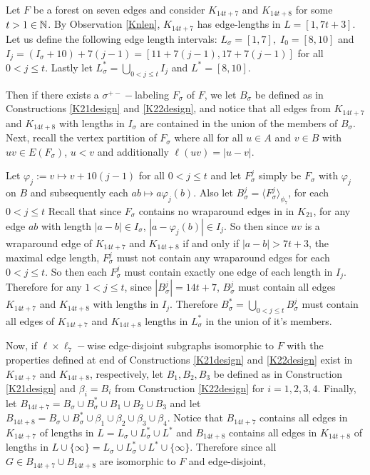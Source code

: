 \begin{construction}\label{7,8mod14}
    Let $F$ be a forest on seven edges and consider $K_{14t+7}$ and $K_{14t+8}$ for some $t > 1\in \mathbb{N}$. By Observation \ref{Knlen}, $K_{14t+7}$ has edge-lengths in $L = [1,7t+3]$.
    Let us define the following edge length intervals: $L_{\sigma}=[1,7],\;I_{0}=[8,10]$ and $I_{j}=(I_{\sigma}+10)+7(j-1)=[11+7(j-1),17+7(j-1)]$ for all $0<j\leq t$. Lastly let $L_{\sigma}^{*}=\bigcup_{0<j\leq t} I_{j}$ and $L^{*}=[8,10]$.

    Then if there exists a $\sigma^{+-}-$labeling $F_{\sigma}$ of $F$, we let $B_{\sigma}$ be defined as in Constructions \ref{K21design} and \ref{K22design}, and notice that all edges from $K_{14t+7}$ and $K_{14t+8}$ with lengths in $I_{\sigma}$ are contained in the union of the members of $B_{\sigma}$. Next, recall the vertex partition of $F_{\sigma}$ where all for all $u\in A$ and $v\in B$ with $uv\in E(F_{\sigma})$, $u<v$ and additionally $\ell(uv)=|u-v|$. 

    Let $\varphi_{j}:=v\mapsto v+10(j-1)$ for all $0<j\leq t$ and let $F^{j}_{\sigma}$ simply be $F_{\sigma}$ with $\varphi_{j}$ on $B$ and subsequently each $ab\mapsto a\varphi_{j}(b)$. Also let $B_{\sigma}^{j}=\langle F^{j}_{\sigma}\rangle_{\phi_{7}}$, for each $0<j\leq t$ Recall that since $F_{\sigma}$ contains no wraparound edges in in $K_{21}$, for any edge $ab$ with length $|a-b|\in I_{\sigma}$, $|a-\varphi_{j}(b)|\in I_{j}$. So then since $uv$ is a wraparound edge of $K_{14t+7}$ and $K_{14t+8}$ if and only if $|a-b|>7t+3$, the maximal edge length, $F^{j}_{\sigma}$ must not contain any wraparound edges for each $0<j\leq t$. So then each $F^{j}_{\sigma}$ must contain exactly one edge of each length in $I_{j}$. Therefore for any $1<j\leq t$, since $|B_{\sigma}^{j}|=14t+7$, $B_{\sigma}^{j}$ must contain all edges $K_{14t+7}$ and $K_{14t+8}$ with lengths in $I_{j}$. Therefore $B_{\sigma}^{*}=\bigcup_{0<j\leq t} B_{\sigma}^{j}$ must contain all edges of $K_{14t+7}$ and $K_{14t+8}$ lengths in $L_{\sigma}^{*}$ in the union of it's members. 

    Now, if $\ell\times \ell_{7}-$wise edge-disjoint subgraphs isomorphic to $F$ with the properties defined at end of Constructions \ref{K21design} and \ref{K22design} exist in $K_{14t+7}$ and $K_{14t+8}$, respectively, let $B_{1},B_{2},B_{3}$ be defined as in Construction \ref{K21design} and $\beta_{i}= B_{i}$ from Construction \ref{K22design} for $i=1,2,3,4$. Finally, let $B_{14t+7}=B_{\sigma}\cup B_{\sigma}^{*}\cup B_{1}\cup B_{2}\cup B_{3}$ and let $B_{14t+8}=B_{\sigma}\cup B_{\sigma}^{*}\cup \beta_{1}\cup \beta_{2}\cup \beta_{3}\cup \beta_{4}$. Notice that $B_{14t+7}$ contains all edges in $K_{14t+7}$ of lengths in $L= L_{\sigma}\cup L_{\sigma}^{*}\cup L^{*}$ and $B_{14t+8}$ contains all edges in $K_{14t+8}$ of lengths in $L\cup \{\infty\}=L_{\sigma}\cup L_{\sigma}^{*}\cup L^{*}\cup \{\infty\}$. Therefore since all $G\in B_{14t+7}\cup B_{14t+8}$ are isomorphic to $F$ and edge-disjoint,


\end{construction}
